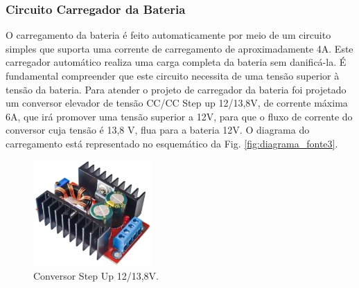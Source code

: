 \subsubsection*{Circuito Carregador da Bateria}

O carregamento da bateria é feito automaticamente por meio de um circuito simples que suporta uma corrente de carregamento de aproximadamente 4A. Este carregador automático realiza uma carga completa da bateria sem danificá-la. É fundamental compreender que este circuito necessita de uma tensão superior à tensão da bateria. Para atender o projeto de carregador da bateria foi projetado um conversor elevador de tensão CC/CC Step up 12/13,8V, de corrente máxima 6A,  que irá promover uma tensão superior a 12V, para que o fluxo de corrente do conversor cuja tensão é 13,8 V, flua para a bateria 12V. O diagrama do carregamento está representado no esquemático da Fig. \ref{fig:diagrama_fonte3}.

\begin{figure}[H]
\centering
    \includegraphics[width=0.4\textwidth]{figuras/energia/fotos_componentes/Energia_Stepup.png}
    \caption{Conversor Step Up 12/13,8V.}
    \label{fig:energia_stepup}
\end{figure}


